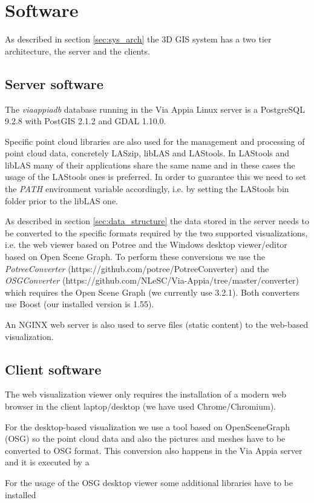 \section{Software}
\label{sec:software}

As described in section \ref{sec:sys_arch} the 3D GIS system has a two tier architecture, the server and the clients. 

\subsection{Server software}

The \textit{viaappiadb} database running in the Via Appia Linux server is a PostgreSQL 9.2.8 with PostGIS 2.1.2 and GDAL 1.10.0.

Specific point cloud libraries are also used for the management and processing of point cloud data, concretely LASzip, libLAS and LAStools. In LAStools and libLAS many of their applications share the same name and in these cases the usage of the LAStools ones is preferred. In order to guarantee this we need to set the \textit{PATH} environment variable accordingly, i.e. by setting the LAStools bin folder prior to the libLAS one.

As described in section \ref{sec:data_structure} the data stored in the server needs to be converted to the specific formats required by the two supported visualizations, i.e. the web viewer based on Potree and the Windows desktop viewer/editor based on Open Scene Graph. To perform these conversions we use the \textit{PotreeConverter} (https://github.com/potree/PotreeConverter) and the \textit{OSGConverter} (https://github.com/NLeSC/Via-Appia/tree/master/converter) which requires the Open Scene Graph (we currently use 3.2.1). Both converters use Boost (our installed version is 1.55).

An NGINX web server is also used to serve files (static content) to the web-based visualization. 

\subsection{Client software}

The web visualization viewer only requires the installation of a modern web browser in the client laptop/desktop (we have used Chrome/Chromium).

For the desktop-based visualization we use a tool based on OpenSceneGraph (OSG) so the point cloud data and also the pictures and meshes have to be converted to OSG format. This conversion also happens in the Via Appia server and it is executed by a

For the usage of the OSG desktop viewer some additional libraries have to be installed



 
